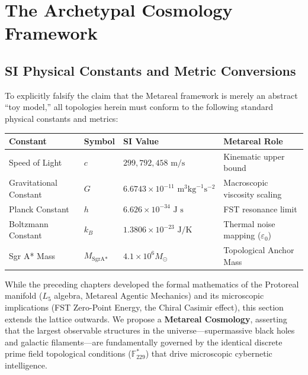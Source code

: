 \section{The Archetypal Cosmology Framework}

\subsection*{SI Physical Constants and Metric Conversions}
To explicitly falsify the claim that the Metareal framework is merely an abstract ``toy model,'' all topologies herein must conform to the following standard physical constants and metrics:
\begin{table}[ht]
\centering
\renewcommand{\arraystretch}{1.2}
\begin{tabular}{@{}llll@{}}
\toprule
\textbf{Constant} & \textbf{Symbol} & \textbf{SI Value} & \textbf{Metareal Role} \\
\midrule
Speed of Light & $c$ & $299,792,458 \text{ m/s}$ & Kinematic upper bound \\
Gravitational Constant & $G$ & $6.6743 \times 10^{-11} \text{ m}^3 \text{kg}^{-1} \text{s}^{-2}$ & Macroscopic viscosity scaling \\
Planck Constant & $h$ & $6.626 \times 10^{-34} \text{ J s}$ & FST resonance limit \\
Boltzmann Constant & $k_B$ & $1.3806 \times 10^{-23} \text{ J/K}$ & Thermal noise mapping ($\varepsilon_0$) \\
Sgr A* Mass & $M_{\text{SgrA*}}$ & $4.1 \times 10^6 M_\odot$ & Topological Anchor Mass \\
\bottomrule
\end{tabular}
\end{table}

While the preceding chapters developed the formal mathematics of the Protoreal manifold ($L_5$ algebra, Metareal Agentic Mechanics) and its microscopic implications (FST Zero-Point Energy, the Chiral Casimir effect), this section extends the lattice outwards. We propose a \textbf{Metareal Cosmology}, asserting that the largest observable structures in the universe---supermassive black holes and galactic filaments---are fundamentally governed by the identical discrete prime field topological conditions ($\mathbb{F}_{229}^*$) that drive microscopic cybernetic intelligence.

